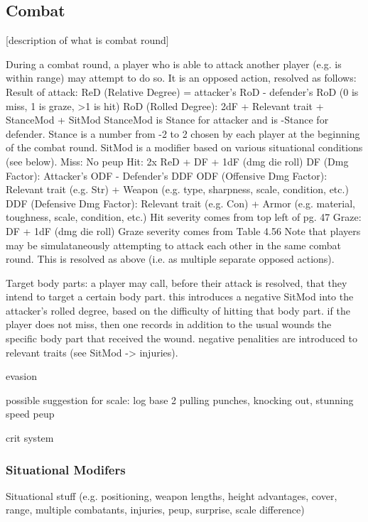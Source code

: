 \documentclass[12pt]{article}
\newcommand{\notes}[1]{{\color{Tan} #1}}
\begin{document}
\subsection{Combat}
\notes{
[description of what is combat round]

	During a combat round, a player who is able to attack another player (e.g. is within range) may attempt to do so.
	It is an opposed action, resolved as follows:
		Result of attack: ReD (Relative Degree) = attacker's RoD - defender's RoD (0 is miss, 1 is graze, >1 is hit)
			RoD (Rolled Degree): 2dF + Relevant trait + StanceMod + SitMod
				StanceMod is Stance for attacker and is -Stance for defender.
					Stance is a number from -2 to 2 chosen by each player at the beginning of the combat round.
				SitMod is a modifier based on various situational conditions (see below).
		Miss: No peup
		Hit: 2x ReD + DF + 1dF (dmg die roll)
			DF (Dmg Factor): Attacker's ODF - Defender's DDF
				ODF (Offensive Dmg Factor): Relevant trait (e.g. Str) + Weapon (e.g. type, sharpness, scale, condition, etc.)
				DDF (Defensive Dmg Factor): Relevant trait (e.g. Con) + Armor (e.g. material, toughness, scale, condition, etc.)
			Hit severity comes from top left of pg. 47
		Graze: DF + 1dF (dmg die roll)
			Graze severity comes from Table 4.56
	Note that players may be simulataneously attempting to attack each other in the same combat round.
	This is resolved as above (i.e. as multiple separate opposed actions).

Target body parts:
a player may call, before their attack is resolved, that they intend to target a certain body part.
this introduces a negative SitMod into the attacker's rolled degree, based on the difficulty of hitting that body part.
if the player does not miss, then one records in addition to the usual wounds the specific body part that received the wound.
negative penalities are introduced to relevant traits (see SitMod -> injuries).

evasion

	possible suggestion for scale: log base 2
pulling punches, knocking out, stunning
speed
peup

crit system
}

\subsubsection{Situational Modifers}
\notes{Situational stuff (e.g. positioning, weapon lengths, height advantages, cover, range, multiple combatants, injuries, peup, surprise, scale difference)}
\end{document}

